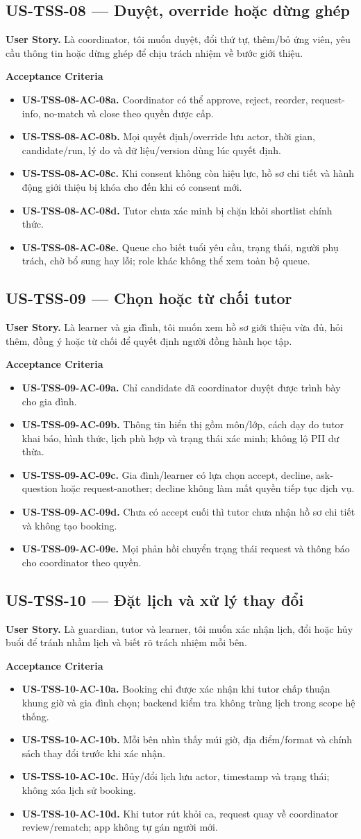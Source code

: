 \documentclass[11pt,a4paper]{article}
\newcommand{\ac}[1]{\textbf{\currentstory-AC-#1.}}
\newcommand{\storytitle}[2]{\subsection{#1 — #2}\def\currentstory{#1}}
\newcommand{\story}[1]{\textbf{User Story.} #1\par}
\newcommand{\acceptance}{\textbf{Acceptance Criteria}\par}
\begin{document}
\storytitle{US-TSS-08}{Duyệt, override hoặc dừng ghép}
\story{Là coordinator, tôi muốn duyệt, đổi thứ tự, thêm/bỏ ứng viên, yêu cầu thông tin hoặc dừng ghép để chịu trách nhiệm về bước giới thiệu.}
\acceptance
\begin{itemize}
  \item \ac{08a} Coordinator có thể approve, reject, reorder, request-info, no-match và close theo quyền được cấp.
  \item \ac{08b} Mọi quyết định/override lưu actor, thời gian, candidate/run, lý do và dữ liệu/version dùng lúc quyết định.
  \item \ac{08c} Khi consent không còn hiệu lực, hồ sơ chi tiết và hành động giới thiệu bị khóa cho đến khi có consent mới.
  \item \ac{08d} Tutor chưa xác minh bị chặn khỏi shortlist chính thức.
  \item \ac{08e} Queue cho biết tuổi yêu cầu, trạng thái, người phụ trách, chờ bổ sung hay lỗi; role khác không thể xem toàn bộ queue.
\end{itemize}

\storytitle{US-TSS-09}{Chọn hoặc từ chối tutor}
\story{Là learner và gia đình, tôi muốn xem hồ sơ giới thiệu vừa đủ, hỏi thêm, đồng ý hoặc từ chối để quyết định người đồng hành học tập.}
\acceptance
\begin{itemize}
  \item \ac{09a} Chỉ candidate đã coordinator duyệt được trình bày cho gia đình.
  \item \ac{09b} Thông tin hiển thị gồm môn/lớp, cách dạy do tutor khai báo, hình thức, lịch phù hợp và trạng thái xác minh; không lộ PII dư thừa.
  \item \ac{09c} Gia đình/learner có lựa chọn accept, decline, ask-question hoặc request-another; decline không làm mất quyền tiếp tục dịch vụ.
  \item \ac{09d} Chưa có accept cuối thì tutor chưa nhận hồ sơ chi tiết và không tạo booking.
  \item \ac{09e} Mọi phản hồi chuyển trạng thái request và thông báo cho coordinator theo quyền.
\end{itemize}

\storytitle{US-TSS-10}{Đặt lịch và xử lý thay đổi}
\story{Là guardian, tutor và learner, tôi muốn xác nhận lịch, đổi hoặc hủy buổi để tránh nhầm lịch và biết rõ trách nhiệm mỗi bên.}
\acceptance
\begin{itemize}
  \item \ac{10a} Booking chỉ được xác nhận khi tutor chấp thuận khung giờ và gia đình chọn; backend kiểm tra không trùng lịch trong scope hệ thống.
  \item \ac{10b} Mỗi bên nhìn thấy múi giờ, địa điểm/format và chính sách thay đổi trước khi xác nhận.
  \item \ac{10c} Hủy/đổi lịch lưu actor, timestamp và trạng thái; không xóa lịch sử booking.
  \item \ac{10d} Khi tutor rút khỏi ca, request quay về coordinator review/rematch; app không tự gán người mới.
\end{itemize}
\end{document}
